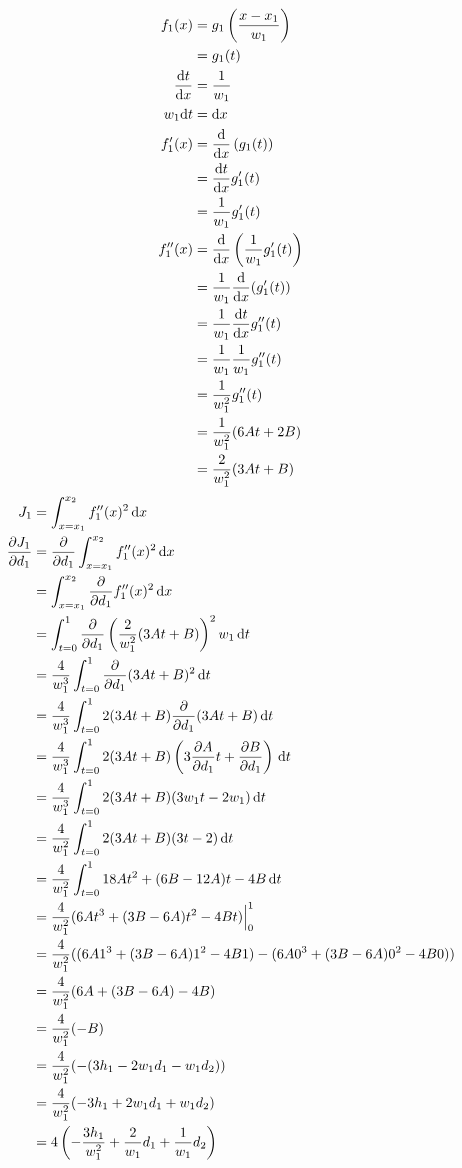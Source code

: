 \documentclass{article}
\begin{document}
\begin{align*}
  f_1(x)
  &= g_1\left(\frac{x-x_1}{w_1}\right) \\
  &= g_1(t) \\
  \frac{\mathrm{d}t}{\mathrm{d}x}
  &= \frac{1}{w_1} \\
  w_1\mathrm{d}t
  &= \mathrm{d}x \\
  f_1'(x)
  &= \frac{\mathrm{d}}{\mathrm{d}x} \left(g_1(t)\right) \\
  &= \frac{\mathrm{d}t}{\mathrm{d}x} g_1'(t) \\
  &= \frac{1}{w_1}g_1'(t) \\
  f_1''(x)
  &= \frac{\mathrm{d}}{\mathrm{d}x} \left(\frac{1}{w_1}g_1'(t)\right) \\
  &= \frac{1}{w_1} \frac{\mathrm{d}}{\mathrm{d}x} (g_1'(t)) \\
  &= \frac{1}{w_1} \frac{\mathrm{d}t}{\mathrm{d}x} g_1''(t) \\
  &= \frac{1}{w_1} \frac{1}{w_1} g_1''(t) \\
  &= \frac{1}{w_1^2} g_1''(t) \\
  &= \frac{1}{w_1^2}(6At+2B) \\
  &= \frac{2}{w_1^2}(3At+B)
\end{align*}
\begin{align*}
  J_1
  &= \int_{x=x_1}^{x_2}f_1''(x)^2\, \mathrm{d}x \\
  \frac{\partial J_1}{\partial d_1}
  &= \frac{\partial}{\partial d_1} \int_{x=x_1}^{x_2} f_1''(x)^2 \, \mathrm{d}x \\
  &= \int_{x=x_1}^{x_2} \frac{\partial}{\partial d_1} f_1''(x)^2 \, \mathrm{d}x \\
  &= \int_{t=0}^{1} \frac{\partial}{\partial d_1} \left(\frac{2}{w_1^2}(3At+B)\right)^2 w_1 \, \mathrm{d}t \\
  &= \frac{4}{w_1^3} \int_{t=0}^{1} \frac{\partial}{\partial d_1} (3At+B)^2 \, \mathrm{d}t \\
  &= \frac{4}{w_1^3} \int_{t=0}^{1} 2(3At+B) \frac{\partial}{\partial d_1} (3At+B) \, \mathrm{d}t \\
  &= \frac{4}{w_1^3} \int_{t=0}^{1} 2(3At+B) \left(3\frac{\partial A}{\partial d_1}t+\frac{\partial B}{\partial d_1}\right) \, \mathrm{d}t \\
  &= \frac{4}{w_1^3} \int_{t=0}^{1} 2(3At+B)(3w_1t-2w_1) \, \mathrm{d}t \\
  &= \frac{4}{w_1^2} \int_{t=0}^{1} 2(3At+B)(3t-2) \, \mathrm{d}t \\
  &= \frac{4}{w_1^2} \int_{t=0}^{1} 18At^2+(6B-12A)t-4B \, \mathrm{d}t \\
  &= \frac{4}{w_1^2} (6At^3+(3B-6A)t^2-4Bt)\Bigr|_0^1 \\
  &= \frac{4}{w_1^2} ((6A1^3+(3B-6A)1^2-4B1)-(6A0^3+(3B-6A)0^2-4B0)) \\
  &= \frac{4}{w_1^2} (6A+(3B-6A)-4B) \\
  &= \frac{4}{w_1^2} (-B) \\
  &= \frac{4}{w_1^2} (-(3h_1-2w_1d_1-w_1d_2)) \\
  &= \frac{4}{w_1^2} (-3h_1+2w_1d_1+w_1d_2) \\
  &= 4\left(-\frac{3h_1}{w_1^2}+\frac{2}{w_1}d_1+\frac{1}{w_1}d_2\right)
\end{align*}
\end{document}
